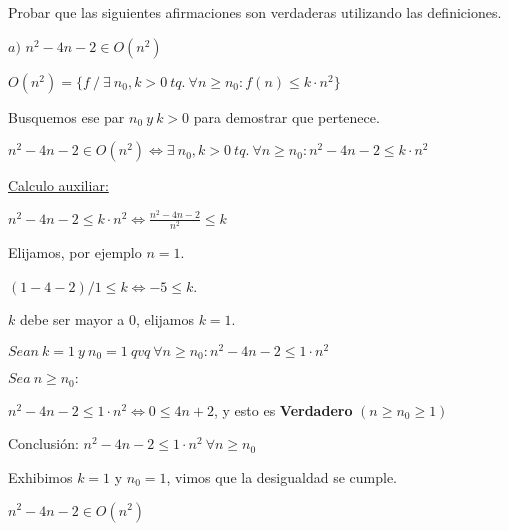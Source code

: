 \documentclass[10pt,a4paper]{article}
\begin{document}
\par Probar que las siguientes afirmaciones son verdaderas utilizando las definiciones.
\demoline

\par $a)$ \ensuremath{n^2 - 4n - 2 \in O(n^2)}
\demoline
\begin{groupIzq}{2.5em}
  \par \ensuremath{O(n^2) = \{f\ /\ \exists\ n_0, k > 0\ tq.\ \forall n \geq n_0 : f(n) \leq k \cdot n^2 \}}
  \par Busquemos ese par \ensuremath{n_0\ y\ k > 0} para demostrar que pertenece.
  \par \ensuremath{n^2 - 4n - 2 \in O(n^2) \Leftrightarrow \exists\ n_0, k > 0\ tq.\ \forall n \geq n_0 : n^2 - 4n - 2 \leq k \cdot n^2}
  \par \underline{Calculo auxiliar:}
  \begin{groupIzq}{0.75em}
    \par \ensuremath{n^2 - 4n - 2 \leq k \cdot n^2 \Leftrightarrow \frac{n^2 - 4n - 2}{n^2} \leq k}
    \par Elijamos, por ejemplo \ensuremath{n=1}.
    \par \ensuremath{(1 - 4 - 2)/1 \leq k \Leftrightarrow -5 \leq k}.
    \par \ensuremath{k} debe ser mayor a 0, elijamos \ensuremath{k=1}.
  \end{groupIzq}
  \par \ensuremath{Sean\ k=1\ y\ n_0=1\ qvq\ \forall n \geq n_0: n^2 - 4n - 2 \leq 1 \cdot n^2}
  \par \ensuremath{Sea\ n \geq n_0:}
  \par \ensuremath{n^2 - 4n - 2 \leq 1 \cdot n^2 \Leftrightarrow 0 \leq 4n + 2}, y esto es \textbf{Verdadero} \ensuremath{(n \geq n_0 \geq 1)}
  \par Conclusión: \ensuremath{n^2 - 4n - 2 \leq 1 \cdot n^2\ \forall n \geq n_0}
  \par Exhibimos \ensuremath{k=1} y \ensuremath{n_0=1}, vimos que la desigualdad se cumple.
  \par \ensuremath{n^2 - 4n - 2 \in O(n^2)}
\end{groupIzq}
\demoline
\demoline
\end{document}
